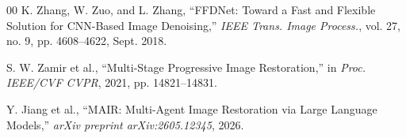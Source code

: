 \documentclass[journal, 10pt]{IEEEtran}
\begin{document}
\begin{thebibliography}{00}
K. Zhang, W. Zuo, and L. Zhang, ``FFDNet: Toward a Fast and Flexible Solution for CNN-Based Image Denoising,'' \textit{IEEE Trans. Image Process.}, vol. 27, no. 9, pp. 4608--4622, Sept. 2018.

S. W. Zamir et al., ``Multi-Stage Progressive Image Restoration,'' in \textit{Proc. IEEE/CVF CVPR}, 2021, pp. 14821--14831.

Y. Jiang et al., ``MAIR: Multi-Agent Image Restoration via Large Language Models,'' \textit{arXiv preprint arXiv:2605.12345}, 2026.

\end{thebibliography}
\end{document}

